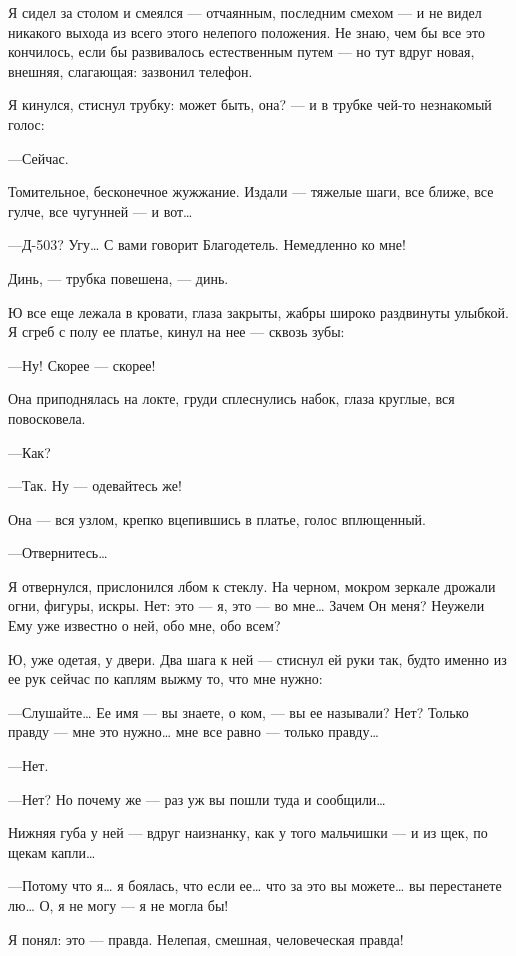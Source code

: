\documentclass[11pt,openany]{book}
\begin{document}
Я сидел за столом и смеялся --- отчаянным, последним смехом --- и не видел никакого выхода из всего этого нелепого положения. Не знаю, чем бы все это кончилось, если бы развивалось естественным путем --- но тут вдруг новая, внешняя, слагающая: зазвонил телефон.

Я кинулся, стиснул трубку: может быть, она? --- и в трубке чей-то незнакомый голос:

---Сейчас.

Томительное, бесконечное жужжание. Издали --- тяжелые шаги, все ближе, все гулче, все чугунней --- и вот\ldots{}

---Д-503? Угу\ldots{} С вами говорит Благодетель. Немедленно ко мне!

Динь, --- трубка повешена, --- динь.

Ю все еще лежала в кровати, глаза закрыты, жабры широко раздвинуты улыбкой. Я сгреб с полу ее платье, кинул на нее --- сквозь зубы:

---Ну! Скорее --- скорее!

Она приподнялась на локте, груди сплеснулись набок, глаза круглые, вся повосковела.

---Как?

---Так. Ну --- одевайтесь же!

Она --- вся узлом, крепко вцепившись в платье, голос вплющенный.

---Отвернитесь\ldots{}

Я отвернулся, прислонился лбом к стеклу. На черном, мокром зеркале дрожали огни, фигуры, искры. Нет: это --- я, это --- во мне\ldots{} Зачем Он меня? Неужели Ему уже известно о ней, обо мне, обо всем?

Ю, уже одетая, у двери. Два шага к ней --- стиснул ей руки так, будто именно из ее рук сейчас по каплям выжму то, что мне нужно:

---Слушайте\ldots{} Ее имя --- вы знаете, о ком, --- вы ее называли? Нет? Только правду --- мне это нужно\ldots{} мне все равно --- только правду\ldots{}

---Нет.

---Нет? Но почему же --- раз уж вы пошли туда и сообщили\ldots{}

Нижняя губа у ней --- вдруг наизнанку, как у того мальчишки --- и из щек, по щекам капли\ldots{}

---Потому что я\ldots{} я боялась, что если ее\ldots{} что за это вы можете\ldots{} вы перестанете лю\ldots{} О, я не могу --- я не могла бы!

Я понял: это --- правда. Нелепая, смешная, человеческая правда!
\end{document}
